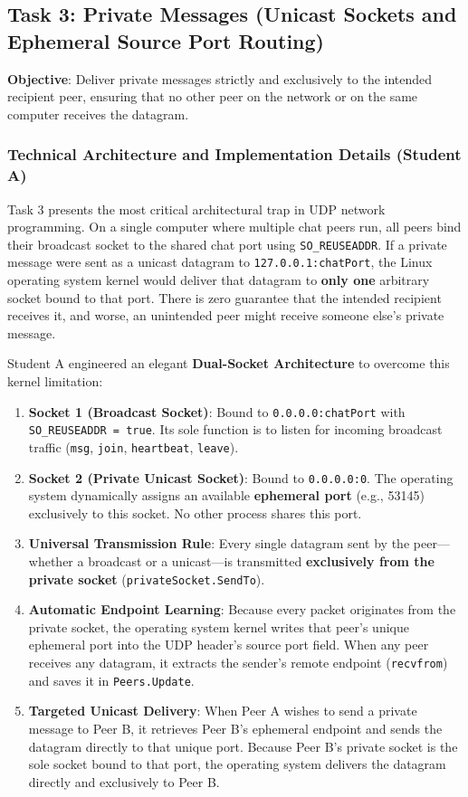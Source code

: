 \documentclass[11pt,a4paper]{article}
\begin{document}
\subsection{Task 3: Private Messages (Unicast Sockets and Ephemeral Source Port Routing)}
\textbf{Objective}: Deliver private messages strictly and exclusively to the intended recipient peer, ensuring that no other peer on the network or on the same computer receives the datagram.

\subsubsection{Technical Architecture and Implementation Details (Student A)}
Task 3 presents the most critical architectural trap in UDP network programming. On a single computer where multiple chat peers run, all peers bind their broadcast socket to the shared chat port using \texttt{SO\_REUSEADDR}. If a private message were sent as a unicast datagram to \texttt{127.0.0.1:chatPort}, the Linux operating system kernel would deliver that datagram to \textbf{only one} arbitrary socket bound to that port. There is zero guarantee that the intended recipient receives it, and worse, an unintended peer might receive someone else's private message.

Student A engineered an elegant \textbf{Dual-Socket Architecture} to overcome this kernel limitation:
\begin{enumerate}
    \item \textbf{Socket 1 (Broadcast Socket)}: Bound to \texttt{0.0.0.0:chatPort} with \texttt{SO\_REUSEADDR = true}. Its sole function is to listen for incoming broadcast traffic (\texttt{msg}, \texttt{join}, \texttt{heartbeat}, \texttt{leave}).
    \item \textbf{Socket 2 (Private Unicast Socket)}: Bound to \texttt{0.0.0.0:0}. The operating system dynamically assigns an available \textbf{ephemeral port} (e.g., 53145) exclusively to this socket. No other process shares this port.
    \item \textbf{Universal Transmission Rule}: Every single datagram sent by the peer—whether a broadcast or a unicast—is transmitted \textbf{exclusively from the private socket} (\texttt{privateSocket.SendTo}).
    \item \textbf{Automatic Endpoint Learning}: Because every packet originates from the private socket, the operating system kernel writes that peer's unique ephemeral port into the UDP header's source port field. When any peer receives any datagram, it extracts the sender's remote endpoint (\texttt{recvfrom}) and saves it in \texttt{Peers.Update}.
    \item \textbf{Targeted Unicast Delivery}: When Peer A wishes to send a private message to Peer B, it retrieves Peer B's ephemeral endpoint and sends the datagram directly to that unique port. Because Peer B's private socket is the sole socket bound to that port, the operating system delivers the datagram directly and exclusively to Peer B.
\end{enumerate}
\end{document}
